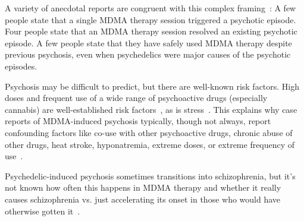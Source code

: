 \documentclass[11pt,oneside]{book}
\let\cite\parencite
\begin{document}
\begin{itemize}
    A variety of anecdotal reports are congruent with this complex framing~\cite{goodmanPsychosis,redditPsychosis1,redditPsychosis2}: A few people state that a single MDMA therapy session triggered a psychotic episode. Four people state that an MDMA therapy session resolved an existing psychotic episode. A few people state that they have safely used MDMA therapy despite previous psychosis, even when psychedelics were major causes of the psychotic episodes.

    Psychosis may be difficult to predict, but there are well-known risk factors. High doses and frequent use of a wide range of psychoactive drugs (especially cannabis) are well-established risk factors~\cite{drugsPsychosis}, as is stress~\cite{winkelPsychosisStress}. This explains why case reports of MDMA-induced psychosis typically, though not always, report confounding factors like co-use with other psychoactive drugs, chronic abuse of other drugs, heat stroke, hyponatremia, extreme doses, or extreme frequency of use~\cite{psychosisTreatment,arnovitzSchizophrenia,mcguirePsychosis,patelPsychosis,vaivaPsychosis}.
    
    Psychedelic-induced psychosis sometimes transitions into schizophrenia, but it's not known how often this happens in MDMA therapy and whether it really causes schizophrenia vs. just accelerating its onset in those who would have otherwise gotten it~\cite{sabeReconsidering}.


\end{itemize}
\end{document}
